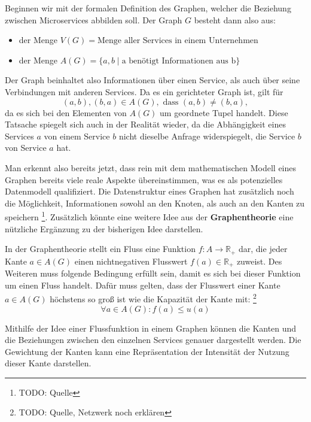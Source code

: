 \documentclass[
	12pt,
	BCOR=5mm,
	DIV=12,
	headinclude=on,
	footinclude=off,
	parskip=half,
	bibliography=totoc,
	listof=entryprefix,
	toc=listof,
	numbers=noenddot,
	plainfootsepline
]{scrreprt}
\begin{document}
\begin{example}
	Beginnen wir mit der formalen Definition des Graphen, welcher die Beziehung zwischen Microservices abbilden soll. Der Graph $G$ besteht dann also aus: 
	\begin{itemize}
		\item der Menge $V(G)=\text{Menge aller Services in einem Unternehmen}$
		\item der Menge $A(G)=\{a,b \mid \text{a benötigt Informationen aus b}\}$
	\end{itemize}
	Der Graph beinhaltet also Informationen über einen Service, als auch über seine Verbindungen mit anderen Services. Da es ein gerichteter Graph ist, gilt für $$(a,b), (b,a) \in A(G),\text{ dass }(a,b) \neq (b,a),$$ da es sich bei den Elementen von $A(G)$ um geordnete Tupel handelt. Diese Tatsache spiegelt sich auch in der Realität wieder, da die Abhängigkeit eines Services $a$ von einem Service $b$ nicht dieselbe Anfrage widerspiegelt, die Service $b$ von Service $a$ hat.
\end{example}\label{exp:microserviceGraph}

Man erkennt also bereits jetzt, dass rein mit dem mathematischen Modell eines Graphen bereits viele reale Aspekte übereinstimmen, was es als potenzielles Datenmodell qualifiziert. Die Datenstruktur eines Graphen hat zusätzlich noch die Möglichkeit, Informationen sowohl an den Knoten, als auch an den Kanten zu speichern \footnote{TODO: Quelle}. Zusätzlich könnte eine weitere Idee aus der \textbf{Graphentheorie} eine nützliche Ergänzung zu der bisherigen Idee darstellen.

\begin{definition}[Fluss]
	In der Graphentheorie stellt ein Fluss eine Funktion $f: A \rightarrow \mathbb{R_+}$ dar, die jeder Kante $a \in A(G)$ einen nichtnegativen Flusswert $f(a) \in \mathbb{R_+}$ zuweist. Des Weiteren muss folgende Bedingung erfüllt sein, damit es sich bei dieser Funktion um einen Fluss handelt. Dafür muss gelten, dass der Flusswert einer Kante $a \in A(G)$ höchstens so groß ist wie die Kapazität der Kante mit: \footnote{TODO: Quelle, Netzwerk noch erklären} $$\forall a \in A(G): f(a) \leq u(a)$$
\end{definition}

Mithilfe der Idee einer Flussfunktion in einem Graphen können die Kanten und die Beziehungen zwischen den einzelnen Services genauer dargestellt werden. Die Gewichtung der Kanten kann eine Repräsentation der Intensität der Nutzung dieser Kante darstellen.
\end{document}
